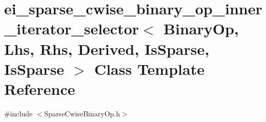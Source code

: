 \hypertarget{classei__sparse__cwise__binary__op__inner__iterator__selector_3_01_binary_op_00_01_lhs_00_01_rhs41884b18ee8e06a3d784c3c098ec6b91}{\section{ei\-\_\-sparse\-\_\-cwise\-\_\-binary\-\_\-op\-\_\-inner\-\_\-iterator\-\_\-selector$<$ Binary\-Op, Lhs, Rhs, Derived, Is\-Sparse, Is\-Sparse $>$ Class Template Reference}
\label{classei__sparse__cwise__binary__op__inner__iterator__selector_3_01_binary_op_00_01_lhs_00_01_rhs41884b18ee8e06a3d784c3c098ec6b91}
}


{\ttfamily \#include $<$Sparse\-Cwise\-Binary\-Op.\-h$>$}

